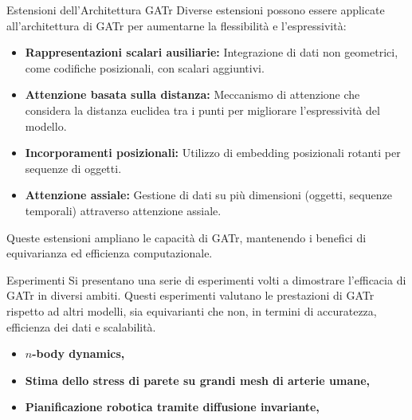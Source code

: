 \begin{frame}{Estensioni dell'Architettura GATr}
    Diverse estensioni possono essere applicate all'architettura di GATr per aumentarne 
    la flessibilità e l'espressività:
    
    \begin{itemize}
        \item \textbf{Rappresentazioni scalari ausiliarie:}  
        Integrazione di dati non geometrici, come codifiche posizionali, con scalari 
        aggiuntivi.
        
        \item \textbf{Attenzione basata sulla distanza:}  
        Meccanismo di attenzione che considera la distanza euclidea tra i punti per 
        migliorare l'espressività del modello.
        
        \item \textbf{Incorporamenti posizionali:}  
        Utilizzo di embedding posizionali rotanti per sequenze di oggetti.
        
        \item \textbf{Attenzione assiale:}  
        Gestione di dati su più dimensioni (oggetti, sequenze temporali) attraverso 
        attenzione assiale.
    \end{itemize}
    
    Queste estensioni ampliano le capacità di GATr, mantenendo i benefici di 
    equivarianza ed efficienza computazionale.
\end{frame}

\begin{frame}{Esperimenti}
    Si presentano una serie di esperimenti volti a dimostrare l'efficacia di 
    GATr in diversi ambiti. Questi esperimenti valutano le prestazioni di GATr 
    rispetto ad altri modelli, sia equivarianti che non, in termini di accuratezza, 
    efficienza dei dati e scalabilità.

    \begin{itemize}
        \item \textbf{ \( n \)-body dynamics, }
        \item \textbf{ Stima dello stress di parete su grandi mesh di arterie umane, }
        \item \textbf{ Pianificazione robotica tramite diffusione invariante, }
    \end{itemize}
\end{frame}


